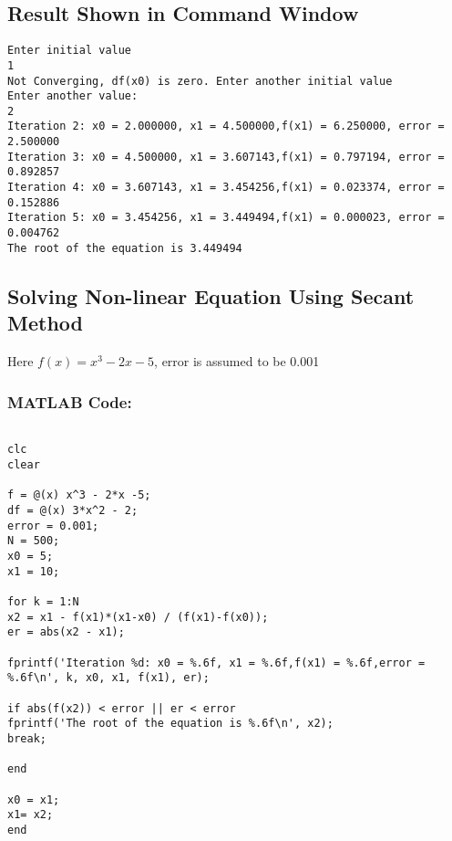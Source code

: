 \documentclass[a4paper,12pt]{article}
\begin{document}
	
	
	\newpage
	\subsection{Result Shown in Command Window}
	
	\begin{lstlisting}[style=vscode-light, caption={Command Window for Newton-Raphson Method} ]
Enter initial value 
1
Not Converging, df(x0) is zero. Enter another initial value 
Enter another value: 
2
Iteration 2: x0 = 2.000000, x1 = 4.500000,f(x1) = 6.250000, error = 2.500000
Iteration 3: x0 = 4.500000, x1 = 3.607143,f(x1) = 0.797194, error = 0.892857
Iteration 4: x0 = 3.607143, x1 = 3.454256,f(x1) = 0.023374, error = 0.152886
Iteration 5: x0 = 3.454256, x1 = 3.449494,f(x1) = 0.000023, error = 0.004762
The root of the equation is 3.449494
	\end{lstlisting}
	
	\subsection{Solving Non-linear Equation Using Secant Method}
	Here $f(x) = x^3 - 2x - 5$, 
	error is assumed to be 0.001 
	
	
	
	\subsubsection{MATLAB Code:}
	\begin{lstlisting}[style=vscode-light, caption={Solving Non-linear Equation Using  Secant Method in MATLAB.} ]
		
clc
clear

f = @(x) x^3 - 2*x -5;  
df = @(x) 3*x^2 - 2;  
error = 0.001;   
N = 500;        
x0 = 5;
x1 = 10;

for k = 1:N
x2 = x1 - f(x1)*(x1-x0) / (f(x1)-f(x0));  
er = abs(x2 - x1);        

fprintf('Iteration %d: x0 = %.6f, x1 = %.6f,f(x1) = %.6f,error = %.6f\n', k, x0, x1, f(x1), er);

if abs(f(x2)) < error || er < error
fprintf('The root of the equation is %.6f\n', x2);
break;

end

x0 = x1;  
x1= x2;
end


	
	
		
		
		
		
	\end{lstlisting}
	
\end{document}
